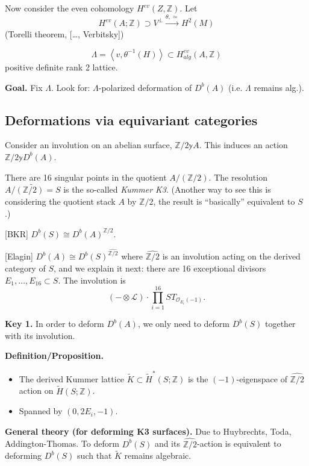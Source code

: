 Now consider the even cohomology
$H^{ev}(Z,\mathbb{Z})$. Let
$$
H^{ev}(A;\mathbb{Z})\supset V^\perp
\xrightarrow{\theta,\simeq }H^{2}(M)
$$
(Torelli theorem, [\ldots{}, Verbitsky])

\begin{remark}
\label{nasak-label-013}
$$
\Lambda=\left\langle{}v,\theta^{-1}(H)\right\rangle{}\subset
H^{ev}_{alg}(A,\mathbb{Z})
$$
positive definite rank 2 lattice.
\end{remark}

{\bf Goal.} Fix $\Lambda$. Look for:
$\Lambda$-polarized deformation of $D^b(A)$
(i.e. $\Lambda$ remains alg.).

\subsection{Deformations via equivariant
categories}
\label{nasak-label-010}

Consider an involution on an abelian surface,
$\mathbb{Z}/2 \mathbb{y} A$. This induces an
action $ \mathbb{Z}/2 \mathbb{y}D^b(A)$.

There are 16 singular points in the quotient
$A/(\mathbb{Z}/2)$. The resolution
$\widetilde{A/(\mathbb{Z}/2)=S}$ is the
so-called {\it Kummer K3}. (Another way to
see this is considering the quotient stack
$A$ by  $\mathbb{Z}/2$, the result is
``basically'' equivalent to $S$.)

[BKR] $D^b(S)\cong D^b(A)^{\mathbb{Z}/2}$.

[Elagin] $D^b(A) \cong
D^b(S)^{\widehat{\mathbb{Z}/2}}$ where
$\widehat{\mathbb{Z}/2}$ is an involution
acting on the derived category of $S$, and we
explain it next: there are 16 exceptional
divisors $E_1,\ldots,E_{16}\subset S$. The
involution is
$$
(- \otimes \mathcal{L})\cdot
\prod_{i=1}^{16}ST_{\mathcal{O}_{E_i}(-1)}.
$$

\medskip\noindent
{\bf Key 1.} In order to deform $D^b(A)$, we
only need to deform $D^b(S)$ together with
its involution.

\medskip\noindent
{\bf Definition/Proposition.}
\begin{itemize}
\item The derived Kummer lattice
$\tilde{K}\subset\tilde{H}^*(S;\mathbb{Z})$
is the $(-1)$-eigenspace of
$\widehat{\mathbb{Z}/2}$ action on
$\tilde{H}(S;\mathbb{Z})$.
\item Spanned by $(0,2E_i,-1)$.
\end{itemize}

\medskip\noindent
{\bf General theory (for deforming K3
surfaces).} Due to Huybrechts, Toda,
Addington-Thomas. To deform $D^b(S)$ and its
$\widehat{\mathbb{Z}/2}$-action is equivalent
to deforming $D^b(S)$ such that $\tilde{K}$
remains algebraic.

